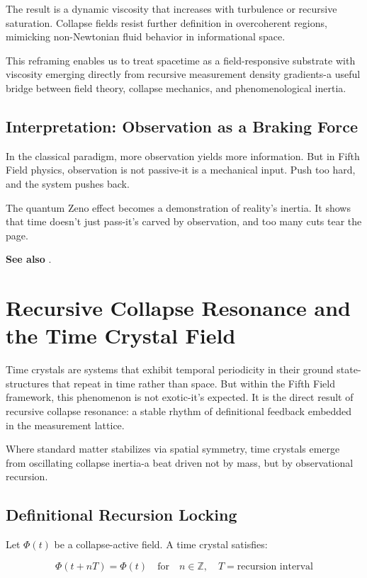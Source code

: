 The result is a dynamic viscosity that increases with turbulence or recursive saturation. Collapse fields resist further definition in overcoherent regions, mimicking non-Newtonian fluid behavior in informational space.

This reframing enables us to treat spacetime as a field-responsive substrate with viscosity emerging directly from recursive measurement density gradients-a useful bridge between field theory, collapse mechanics, and phenomenological inertia.

\subsection{Interpretation: Observation as a Braking Force}

In the classical paradigm, more observation yields more information. But in Fifth Field physics, observation is not passive-it is a mechanical input. Push too hard, and the system pushes back.

The quantum Zeno effect becomes a demonstration of reality's inertia. It shows that time doesn’t just pass-it’s carved by observation, and too many cuts tear the page.

\textbf{See also} \cite{chapter8_meta}.

\section{Recursive Collapse Resonance and the Time Crystal Field}

Time crystals are systems that exhibit temporal periodicity in their ground state-structures that repeat in time rather than space. But within the Fifth Field framework, this phenomenon is not exotic-it’s expected. It is the direct result of recursive collapse resonance: a stable rhythm of definitional feedback embedded in the measurement lattice.

Where standard matter stabilizes via spatial symmetry, time crystals emerge from oscillating collapse inertia-a beat driven not by mass, but by observational recursion.

\subsection{Definitional Recursion Locking}

Let \( \Phi(t) \) be a collapse-active field. A time crystal satisfies:

\[
\Phi(t + nT) = \Phi(t)
\quad \text{for} \quad n \in \mathbb{Z}, \quad T = \text{recursion interval}
\]

